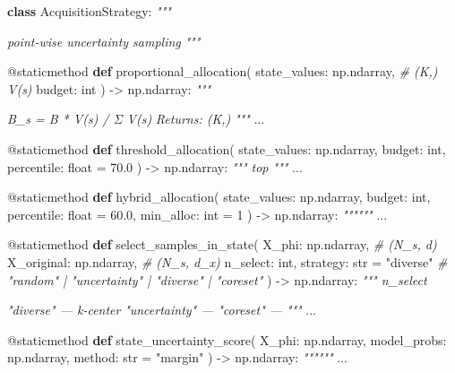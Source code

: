 \documentclass[
  12pt,
]{article}
\newenvironment{Shaded}{}{}
\newcommand{\AttributeTok}[1]{\textcolor[rgb]{0.49,0.56,0.16}{#1}}
\newcommand{\BuiltInTok}[1]{\textcolor[rgb]{0.00,0.50,0.00}{#1}}
\newcommand{\CommentTok}[1]{\textcolor[rgb]{0.38,0.63,0.69}{\textit{#1}}}
\newcommand{\DecValTok}[1]{\textcolor[rgb]{0.25,0.63,0.44}{#1}}
\newcommand{\FloatTok}[1]{\textcolor[rgb]{0.25,0.63,0.44}{#1}}
\newcommand{\KeywordTok}[1]{\textcolor[rgb]{0.00,0.44,0.13}{\textbf{#1}}}
\newcommand{\NormalTok}[1]{#1}
\newcommand{\OperatorTok}[1]{\textcolor[rgb]{0.40,0.40,0.40}{#1}}
\newcommand{\StringTok}[1]{\textcolor[rgb]{0.25,0.44,0.63}{#1}}
\begin{document}
\begin{Shaded}
\begin{Highlighting}[]
\KeywordTok{class}\NormalTok{ AcquisitionStrategy:}
    \CommentTok{"""}

\CommentTok{     point{-}wise  uncertainty sampling}
\CommentTok{    }
\CommentTok{    """}

    \AttributeTok{@staticmethod}
    \KeywordTok{def}\NormalTok{ proportional\_allocation(}
\NormalTok{        state\_values: np.ndarray,    }\CommentTok{\# (K,) V(s)}
\NormalTok{        budget: }\BuiltInTok{int}
\NormalTok{    ) }\OperatorTok{{-}\textgreater{}}\NormalTok{ np.ndarray:}
        \CommentTok{"""}

\CommentTok{        B\_s = B * V(s) / Σ V(s\textquotesingle{})}
\CommentTok{        Returns: (K,) }
\CommentTok{        """}
\NormalTok{        ...}

    \AttributeTok{@staticmethod}
    \KeywordTok{def}\NormalTok{ threshold\_allocation(}
\NormalTok{        state\_values: np.ndarray,}
\NormalTok{        budget: }\BuiltInTok{int}\NormalTok{,}
\NormalTok{        percentile: }\BuiltInTok{float} \OperatorTok{=} \FloatTok{70.0}
\NormalTok{    ) }\OperatorTok{{-}\textgreater{}}\NormalTok{ np.ndarray:}
        \CommentTok{""" top """}
\NormalTok{        ...}

    \AttributeTok{@staticmethod}
    \KeywordTok{def}\NormalTok{ hybrid\_allocation(}
\NormalTok{        state\_values: np.ndarray,}
\NormalTok{        budget: }\BuiltInTok{int}\NormalTok{,}
\NormalTok{        percentile: }\BuiltInTok{float} \OperatorTok{=} \FloatTok{60.0}\NormalTok{,}
\NormalTok{        min\_alloc: }\BuiltInTok{int} \OperatorTok{=} \DecValTok{1}
\NormalTok{    ) }\OperatorTok{{-}\textgreater{}}\NormalTok{ np.ndarray:}
        \CommentTok{""""""}
\NormalTok{        ...}

    \AttributeTok{@staticmethod}
    \KeywordTok{def}\NormalTok{ select\_samples\_in\_state(}
\NormalTok{        X\_phi: np.ndarray,           }\CommentTok{\# (N\_s, d) }
\NormalTok{        X\_original: np.ndarray,      }\CommentTok{\# (N\_s, d\_x) }
\NormalTok{        n\_select: }\BuiltInTok{int}\NormalTok{,}
\NormalTok{        strategy: }\BuiltInTok{str} \OperatorTok{=} \StringTok{"diverse"}    \CommentTok{\# "random" | "uncertainty" | "diverse" | "coreset"}
\NormalTok{    ) }\OperatorTok{{-}\textgreater{}}\NormalTok{ np.ndarray:}
        \CommentTok{""" n\_select }

\CommentTok{        "diverse" —  k{-}center }
\CommentTok{        "uncertainty" — }
\CommentTok{        "coreset" — }
\CommentTok{        """}
\NormalTok{        ...}

    \AttributeTok{@staticmethod}
    \KeywordTok{def}\NormalTok{ state\_uncertainty\_score(}
\NormalTok{        X\_phi: np.ndarray,}
\NormalTok{        model\_probs: np.ndarray,}
\NormalTok{        method: }\BuiltInTok{str} \OperatorTok{=} \StringTok{"margin"}
\NormalTok{    ) }\OperatorTok{{-}\textgreater{}}\NormalTok{ np.ndarray:}
        \CommentTok{""""""}
\NormalTok{        ...}
\end{Highlighting}
\end{Shaded}
\end{document}
